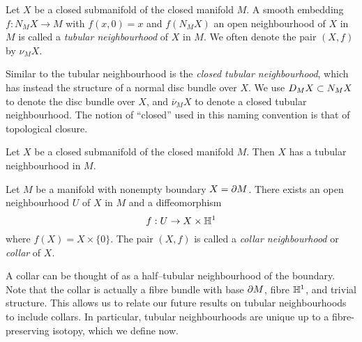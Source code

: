 \begin{defn}
	\label{def:tubularneighbourhood}
	Let $X$ be a closed submanifold of the closed manifold $M$.
	A smooth embedding $f:N_M X\to M$ with $f(x,0)=x$ and $f(N_M X)$ an open neighbourhood of $X$ in $M$ is called a \emph{tubular neighbourhood} of $X$ in $M$.
	We often denote the pair $(X,f)$ by $\nu_M X$.
\end{defn}

Similar to the tubular neighbourhood is the \emph{closed tubular neighbourhood}, which has instead the structure of a normal disc bundle over $X$.
We use $D_M X\subset N_M X$ to denote the disc bundle over $X$, and $\overline{\nu}_M X$ to denote a closed tubular neighbourhood.
The notion of ``closed'' used in this naming convention is that of topological closure.

\begin{theorem}
	\label{thm:tubularneighbourhood}
	Let $X$ be a closed submanifold of the closed manifold $M$.
	Then $X$ has a tubular neighbourhood in $M$.
\end{theorem}

\begin{prop}[Collar]
	\label{defthm:collar}
	Let $M$ be a manifold with nonempty boundary $X = \partial M$.
	There exists an open neighbourhood $U$ of $X$ in $M$ and a diffeomorphism
	\[
	f: U \to X\times\mathbb{H}^1
	\]
	where $f(X)=X\times \{0\}$.
	The pair $(X,f)$ is called a \emph{collar neighbourhood} or \emph{collar} of $X$.	
\end{prop}

A collar can be thought of as a half--tubular neighbourhood of the boundary.
Note that the collar is actually a fibre bundle with base $\partial M$, fibre $\mathbb{H}^1$, and trivial structure.
This allows us to relate our future results on tubular neighbourhoods to include collars.
In particular, tubular neighbourhoods are unique up to a fibre-preserving isotopy, which we define now.

